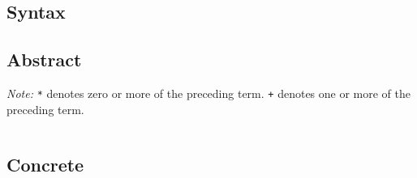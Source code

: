 \documentclass[a4paper, 12pt]{article}
\begin{document}
\newpage
\begin{appendices}
    \section{Syntax}\label{sec:syntax}
    \subsection{Abstract}
    \textit{Note:} \texttt{*} denotes zero or more of the preceding term. \texttt{+} denotes one or more of the preceding term.
    \inputminted[fontsize=\footnotesize, samepage]{bnf}{grammar_abstract.bnf}

    \subsection{Concrete}
    \inputminted[fontsize=\footnotesize, samepage]{ebnf}{grammar.ebnf}
\end{appendices}
\end{document}
